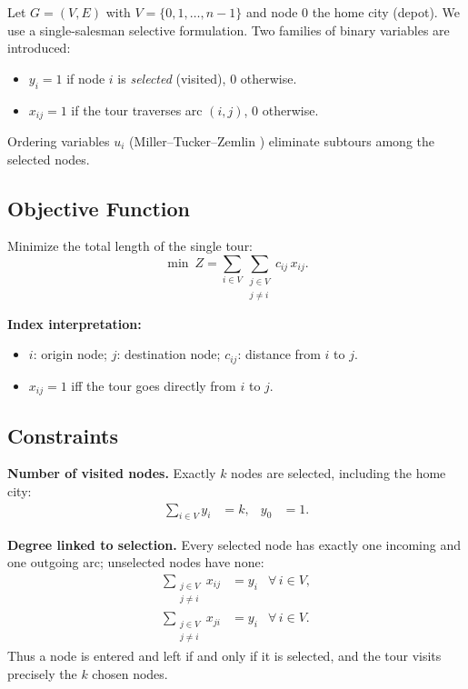 \documentclass[conference]{IEEEtran}
\begin{document}
Let $G=(V,E)$ with $V=\{0,1,\dots,n-1\}$ and node $0$ the home city (depot). We use a single-salesman selective formulation. Two families of binary variables are introduced:
\begin{itemize}
  \item $y_i=1$ if node $i$ is \emph{selected} (visited), $0$ otherwise.
  \item $x_{ij}=1$ if the tour traverses arc $(i,j)$, $0$ otherwise.
\end{itemize}
Ordering variables $u_i$ (Miller--Tucker--Zemlin \cite{miller1960mtz}) eliminate subtours among the selected nodes.

\subsection*{Objective Function}
Minimize the total length of the single tour:
\begin{equation}
\min\ Z = \sum_{i\in V}\sum_{\substack{j\in V\\ j\neq i}} c_{ij}\,x_{ij}.
\end{equation}

\noindent\textbf{Index interpretation:}
\begin{itemize}
    \item $i$: origin node; $j$: destination node; $c_{ij}$: distance from $i$ to $j$.
    \item $x_{ij}=1$ iff the tour goes directly from $i$ to $j$.
\end{itemize}

\subsection*{Constraints}

\noindent\textbf{Number of visited nodes.} Exactly $k$ nodes are selected, including the home city:
\begin{align}
\sum_{i\in V} y_i &= k, & y_0 &= 1.
\end{align}

\noindent\textbf{Degree linked to selection.} Every selected node has exactly one incoming and one outgoing arc; unselected nodes have none:
\begin{align}
\sum_{\substack{j\in V\\ j\neq i}} x_{ij} &= y_i & \forall\, i\in V,\\
\sum_{\substack{j\in V\\ j\neq i}} x_{ji} &= y_i & \forall\, i\in V.
\end{align}
Thus a node is entered and left if and only if it is selected, and the tour visits precisely the $k$ chosen nodes.
\end{document}
